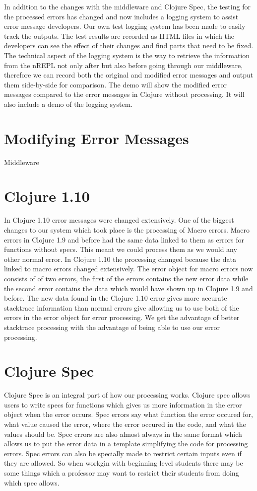 \documentclass[12pt]{article}
\begin{document}
In addition to the changes with the middleware and Clojure Spec, the testing for the processed errors has changed and now includes a logging system to assist error message developers. Our own test logging system has been made to easily track the outputs. The test results are recorded as HTML files in which the developers can see the effect of their changes and find parts that need to be fixed. The technical aspect of the logging system is the way to retrieve the information from the nREPL not only after but also before going through our middleware, therefore we can record both the original and modified error messages and output them side-by-side for comparison.
The demo will show the modified error messages compared to the error messages in Clojure without processing. It will also include a demo of the logging system.

\section{Modifying Error Messages}
Middleware

\section{Clojure 1.10}
In Clojure 1.10 error messages were changed extensively. One of the biggest changes to our system which took place is the processing of Macro errors. Macro errors in Clojure 1.9 and before had the same data linked to them as errors for functions without specs. This meant we could process them as we would any other normal error. In Clojure 1.10 the processing changed because the data linked to macro errors changed extensively. The error object for macro errors now consists of of two errors, the first of the errors contains the new error data while the second error contains the data which would have shown up in Clojure 1.9 and before. The new data found in the Clojure 1.10 error gives more accurate stacktrace information than normal errors give allowing us to use both of the errors in the error object for error processing. We get the advantage of better stacktrace processing with the advantage of being able to use our error processing.

\section{Clojure Spec}
Clojure Spec is an integral part of how our processing works. Clojure spec allows users to write specs for functions which gives us more information in the error object when the error occurs. Spec errors say what function the error occured for, what value caused the error, where the error occured in the code, and what the values should be. Spec errors are also almost always in the same format which allows us to put the error data in a template simplifying the code for processing errors. Spec errors can also be specially made to restrict certain inputs even if they are allowed. So when workgin with beginning level students there may be some things which a professor may want to restrict their students from doing which spec allows.
\end{document}
